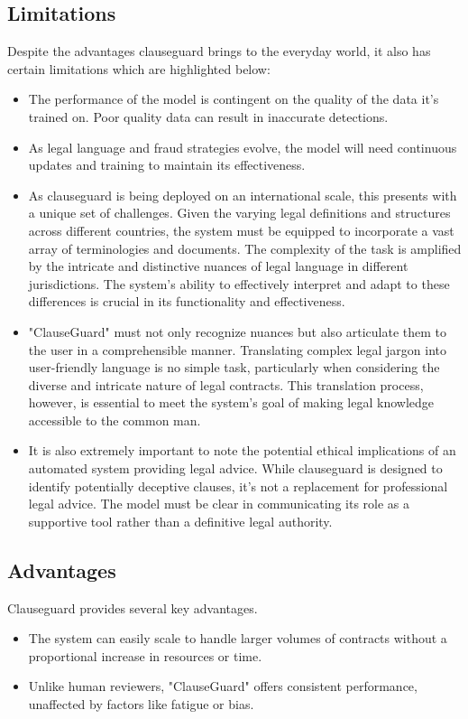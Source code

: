 \begin{itemize}
    \subsection{Limitations}
    Despite the advantages clauseguard brings to the everyday world, it also has certain limitations which are highlighted below: \begin{itemize}
        \item The performance of the model is contingent on the quality of the data it's trained on. Poor quality data can result in inaccurate detections.
        \item As legal language and fraud strategies evolve, the model will need continuous updates and training to maintain its effectiveness.
        \item As clauseguard is being deployed on an international scale, this presents with a unique set of challenges. Given the varying legal definitions and structures across different countries, the system must be equipped to incorporate a vast array of terminologies and documents. The complexity of the task is amplified by the intricate and distinctive nuances of legal language in different jurisdictions. The system's ability to effectively interpret and adapt to these differences is crucial in its functionality and effectiveness.


        \item  "ClauseGuard" must not only recognize nuances but also articulate them to the user in a comprehensible manner. Translating complex legal jargon into user-friendly language is no simple task, particularly when considering the diverse and intricate nature of legal contracts. This translation process, however, is essential to meet the system's goal of making legal knowledge accessible to the common man.
        \item It is also extremely important to note the potential ethical implications of an automated system providing legal advice. While clauseguard is designed to identify potentially deceptive clauses, it's not a replacement for professional legal advice. The model must be clear in communicating its role as a supportive tool rather than a definitive legal authority.
        




        
    \end{itemize}

\subsection{Advantages}
        Clauseguard provides several key advantages. 
        \begin{itemize}
            \item The system can easily scale to handle larger volumes of contracts without a proportional increase in resources or time.
            \item Unlike human reviewers, "ClauseGuard" offers consistent performance, unaffected by factors like fatigue or bias.



\end{itemize}
\end{itemize}
